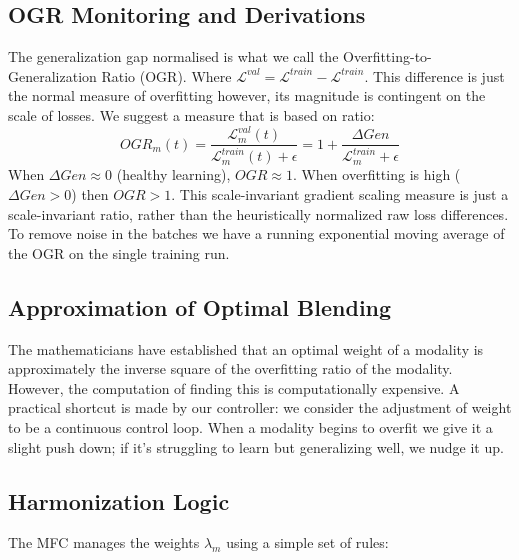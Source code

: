 \documentclass[10pt, twocolumn, letterpaper]{article}
\begin{document}
\subsection{OGR Monitoring and Derivations}
The generalization gap normalised is what we call the Overfitting-to-Generalization Ratio (OGR). Where $\mathcal{L}^{val} = \mathcal{L}^{train} - \mathcal{L}^{train}$. This difference is just the normal measure of overfitting however, its magnitude is contingent on the scale of losses. We suggest a measure that is based on ratio:
\begin{equation}
    OGR_m(t) = \frac{\mathcal{L}^{val}_m(t)}{\mathcal{L}^{train}_m(t) + \epsilon} = 1 + \frac{\Delta Gen}{\mathcal{L}^{train}_m + \epsilon}
\end{equation}
When $\Delta Gen \approx 0$ (healthy learning), $OGR \approx 1$. When overfitting is high ($\Delta Gen > 0$) then $OGR > 1$. This scale-invariant gradient scaling measure is just a scale-invariant ratio, rather than the heuristically normalized raw loss differences. To remove noise in the batches we have a running exponential moving average of the OGR on the single training run.

\subsection{Approximation of Optimal Blending}
The mathematicians have established \cite{wang2020makes} that an optimal weight of a modality is approximately the inverse square of the overfitting ratio of the modality. However, the computation of finding this is computationally expensive. A practical shortcut is made by our controller: we consider the adjustment of weight to be a continuous control loop. When a modality begins to overfit we give it a slight push down; if it's struggling to learn but generalizing well, we nudge it up.

\subsection{Harmonization Logic}
The MFC manages the weights $\lambda_m$ using a simple set of rules:
\end{document}
